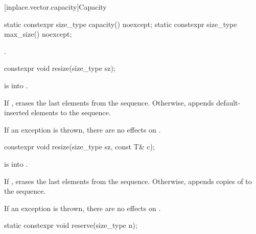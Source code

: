[inplace.vector.capacity]{Capacity}

%
%
\begin{itemdecl}
static constexpr size_type capacity() noexcept;
static constexpr size_type max_size() noexcept;
\end{itemdecl}

\begin{itemdescr}
\pnum
\returns
{}.
\end{itemdescr}

%
\begin{itemdecl}
constexpr void resize(size_type sz);
\end{itemdecl}

\begin{itemdescr}
\pnum
\expects
{} is  into .

\pnum
\effects
If ,
erases the last  elements from the sequence.
Otherwise,
appends  default-inserted elements to the sequence.

\pnum
\remarks
If an exception is thrown, there are no effects on .
\end{itemdescr}

%
\begin{itemdecl}
constexpr void resize(size_type sz, const T& c);
\end{itemdecl}

\begin{itemdescr}
\pnum
\expects
{} is  into .

\pnum
\effects
If ,
erases the last  elements from the sequence.
Otherwise,
appends  copies of  to the sequence.

\pnum
\remarks
If an exception is thrown, there are no effects on .
\end{itemdescr}

%
\begin{itemdecl}
static constexpr void reserve(size_type n);
\end{itemdecl}

